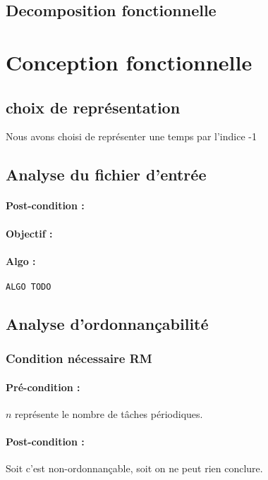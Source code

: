 		\subsection{Decomposition fonctionnelle}

	\section{Conception fonctionnelle}
		
		\subsection{choix de représentation}
			Nous avons choisi de représenter une temps par l'indice -1
						
		\subsection{Analyse du fichier d'entrée}
				\paragraph{Post-condition :} 
				\paragraph{Objectif :} 
				\paragraph{Algo :} 
					\begin{verbatim}
ALGO TODO
					\end{verbatim}
		
		
		\subsection{Analyse d'ordonnançabilité}
			
			\subsubsection{Condition nécessaire RM}
				\paragraph{Pré-condition :} $n$ représente le nombre de tâches périodiques.
				\paragraph{Post-condition :} Soit c'est non-ordonnançable, soit on ne peut rien conclure.
